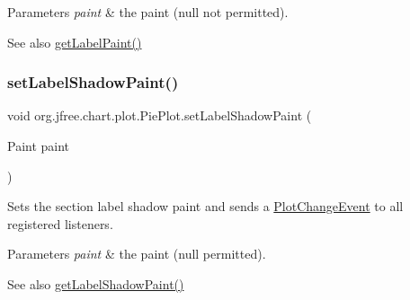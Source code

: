 \begin{DoxyParams}{Parameters}
{\em paint} & the paint ({\ttfamily null} not permitted).\\
\hline
\end{DoxyParams}
\begin{DoxySeeAlso}{See also}
\mbox{\hyperlink{classorg_1_1jfree_1_1chart_1_1plot_1_1_pie_plot_a74d3e481e1a19221ec0609717eed9197}{get\+Label\+Paint()}} 
\end{DoxySeeAlso}
\mbox{\label{classorg_1_1jfree_1_1chart_1_1plot_1_1_pie_plot_aeb9d4d1a5664515d7202816d553613f0}} 
\subsubsection{\texorpdfstring{set\+Label\+Shadow\+Paint()}{setLabelShadowPaint()}}
{\footnotesize\ttfamily void org.\+jfree.\+chart.\+plot.\+Pie\+Plot.\+set\+Label\+Shadow\+Paint (\begin{DoxyParamCaption}\item[{Paint}]{paint }\end{DoxyParamCaption})}

Sets the section label shadow paint and sends a \mbox{\hyperlink{}{Plot\+Change\+Event}} to all registered listeners.


\begin{DoxyParams}{Parameters}
{\em paint} & the paint ({\ttfamily null} permitted).\\
\hline
\end{DoxyParams}
\begin{DoxySeeAlso}{See also}
\mbox{\hyperlink{classorg_1_1jfree_1_1chart_1_1plot_1_1_pie_plot_a09e7247103d5d1a36b12783c235a574f}{get\+Label\+Shadow\+Paint()}} 
\end{DoxySeeAlso}
\mbox{\label{classorg_1_1jfree_1_1chart_1_1plot_1_1_pie_plot_a017e05045841e9e069d9ac5a50a7d5b1}} 
